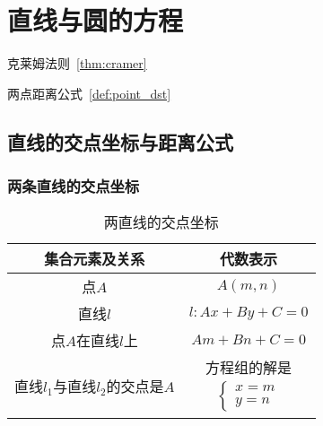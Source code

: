 \chapter{直线与圆的方程}
\label{ch:直线与圆的方程}

\begin{introduction}
  \item 克莱姆法则~\ref{thm:cramer}
  \item 两点距离公式~\ref{def:point_dst}
\end{introduction}


\section{直线的交点坐标与距离公式}

\subsection{两条直线的交点坐标}

\begin{table}[htbp]
  \caption{两直线的交点坐标\label{tab:color thm}}
  \centering
  \begin{tabular}{cc}
  \toprule
              集合元素及关系
              & 代数表示\\
  \midrule
              点$A$
              & $A(m, n)$ \\
              直线$l$
              & $l: Ax+By+C=0$ \\
              点$A$在直线$l$上
              & $Am+Bn+C=0$\\
              直线$l_1$与直线$l_2$的交点是$A$
              & 方程组的解是 \begin{eqnarray}
                \left \{
                \begin{array}{l}
                    x = m\\
                    y = n
                \end{array}	
                \right .
                \end{eqnarray}\\
  \bottomrule
  \end{tabular}
\end{table}


